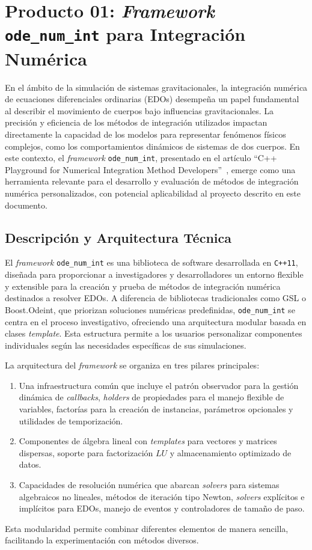 \section[\textit{Framework} \texttt{ode\_num\_int}]{Producto 01: \textit{Framework} \texttt{ode\_num\_int} para Integración Numérica}%
\label{sec:state_of_the_art_01}

En el ámbito de la simulación de sistemas gravitacionales, la integración numérica de ecuaciones diferenciales ordinarias (EDOs) desempeña un papel fundamental al describir el movimiento de cuerpos bajo influencias gravitacionales. La precisión y eficiencia de los métodos de integración utilizados impactan directamente la capacidad de los modelos para representar fenómenos físicos complejos, como los comportamientos dinámicos de sistemas de dos cuerpos. En este contexto, el \textit{framework} \texttt{ode\_num\_int}, presentado en el artículo ``C++ Playground for Numerical Integration Method Developers''~\cite{Orlov2017}, emerge como una herramienta relevante para el desarrollo y evaluación de métodos de integración numérica personalizados, con potencial aplicabilidad al proyecto descrito en este documento.

\subsection{Descripción y Arquitectura Técnica}

El \textit{framework} \texttt{ode\_num\_int} es una biblioteca de software desarrollada en \texttt{C++11}, diseñada para proporcionar a investigadores y desarrolladores un entorno flexible y extensible para la creación y prueba de métodos de integración numérica destinados a resolver EDOs. A diferencia de bibliotecas tradicionales como GSL o Boost.Odeint, que priorizan soluciones numéricas predefinidas, \texttt{ode\_num\_int} se centra en el proceso investigativo, ofreciendo una arquitectura modular basada en clases \textit{template}. Esta estructura permite a los usuarios personalizar componentes individuales según las necesidades específicas de sus simulaciones.

La arquitectura del \textit{framework} se organiza en tres pilares principales:
\begin{enumerate}
    \item Una infraestructura común que incluye el patrón observador para la gestión dinámica de \textit{callbacks}, \textit{holders} de propiedades para el manejo flexible de variables, factorías para la creación de instancias, parámetros opcionales y utilidades de temporización.
    \item Componentes de álgebra lineal con \textit{templates} para vectores y matrices dispersas, soporte para factorización $LU$ y almacenamiento optimizado de datos.
    \item Capacidades de resolución numérica que abarcan \textit{solvers} para sistemas algebraicos no lineales, métodos de iteración tipo Newton, \textit{solvers} explícitos e implícitos para EDOs, manejo de eventos y controladores de tamaño de paso.
\end{enumerate}
Esta modularidad permite combinar diferentes elementos de manera sencilla, facilitando la experimentación con métodos diversos.

